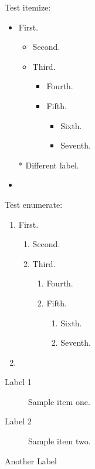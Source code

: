 \documentclass{article}
\begin{document}
Test itemize:
\begin{itemize}
\item First.
 \begin{itemize}
  \item Second.
  \item Third.
  \begin{itemize}
   \item Fourth.
   \item Fifth.
    \begin{itemize}
     \item Sixth.
     \item Seventh.
    \end{itemize}
  \end{itemize}
 \end{itemize}
\item[*] Different label.
\item \lipsum[1]
\end{itemize}

Test enumerate:
\begin{enumerate}
\item First.
 \begin{enumerate}
  \item Second.
  \item Third.
  \begin{enumerate}
   \item Fourth.
   \item Fifth.
    \begin{enumerate}
     \item Sixth.
     \item Seventh.
    \end{enumerate}
  \end{enumerate}
 \end{enumerate}
\item \lipsum[1]
\end{enumerate}

\begin{description}
\item[Label 1] Sample item one.
\item[Label 2] Sample item two.
\item[Another Label] \lipsum[1]
\end{description}
\end{document}
